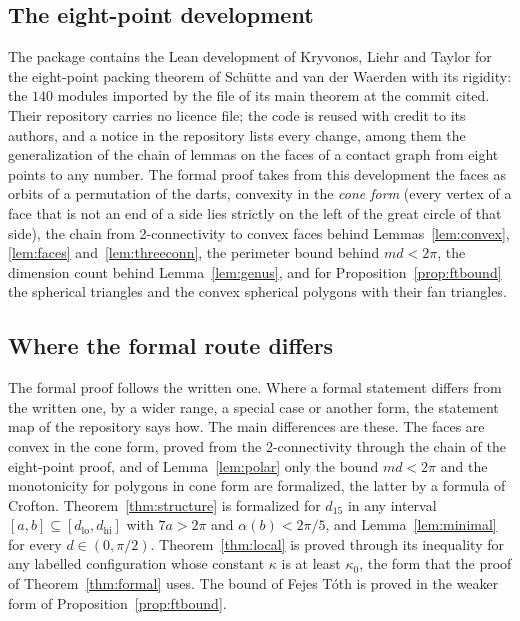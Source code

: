 \documentclass[12pt]{amsart}
\theoremstyle{definition}
\theoremstyle{plain}
\theoremstyle{definition}
\newcommand{\dlo}{d_{\mathrm{lo}}}
\newcommand{\dhi}{d_{\mathrm{hi}}}
\begin{document}
\subsection{The eight-point development}\label{sec:eightpoint}
The package contains the Lean development of Kryvonos, Liehr and Taylor \cite{KLT} for the eight-point packing theorem of Sch\"utte and van der Waerden with its rigidity: the $140$ modules imported by the file of its main theorem at the commit cited. Their repository carries no licence file; the code is reused with credit to its authors, and a notice in the repository lists every change, among them the generalization of the chain of lemmas on the faces of a contact graph from eight points to any number. The formal proof takes from this development the faces as orbits of a permutation of the darts, convexity in the \emph{cone form} (every vertex of a face that is not an end of a side lies strictly on the left of the great circle of that side), the chain from 2-connectivity to convex faces behind Lemmas~\ref{lem:convex}, \ref{lem:faces} and~\ref{lem:threeconn}, the perimeter bound behind $md<2\pi$, the dimension count behind Lemma~\ref{lem:genus}, and for Proposition~\ref{prop:ftbound} the spherical triangles and the convex spherical polygons with their fan triangles.

\subsection{Where the formal route differs}\label{sec:formaldiff}
The formal proof follows the written one. Where a formal statement differs from the written one, by a wider range, a special case or another form, the statement map of the repository says how. The main differences are these. The faces are convex in the cone form, proved from the 2-connectivity through the chain of the eight-point proof, and of Lemma~\ref{lem:polar} only the bound $md<2\pi$ and the monotonicity for polygons in cone form are formalized, the latter by a formula of Crofton. Theorem~\ref{thm:structure} is formalized for $d_{15}$ in any interval $[a,b]\subseteq[\dlo,\dhi]$ with $7a>2\pi$ and $\alpha(b)<2\pi/5$, and Lemma~\ref{lem:minimal} for every $d\in(0,\pi/2)$. Theorem~\ref{thm:local} is proved through its inequality for any labelled configuration whose constant $\kappa$ is at least $\kappa_0$, the form that the proof of Theorem~\ref{thm:formal} uses. The bound of Fejes T\'oth is proved in the weaker form of Proposition~\ref{prop:ftbound}.
\end{document}

